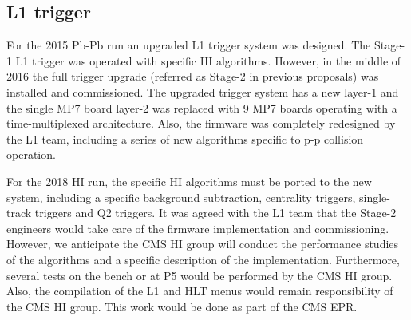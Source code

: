 \subsection{L1 trigger\label{subsec:L1Trigger}} For the 2015 Pb-Pb run an upgraded L1 trigger system was designed. The
Stage-1 L1 trigger was operated with specific HI algorithms. However, in the middle of 2016 the full trigger upgrade
(referred as Stage-2 in previous proposals) was installed and commissioned. The upgraded trigger system has a new
layer-1 and the single MP7 board layer-2 was replaced with 9 MP7 boards operating with a time-multiplexed architecture.
Also, the firmware was completely redesigned by the L1 team, including a series of new algorithms specific to p-p
collision operation.

For the 2018 HI run, the specific HI algorithms must be ported to the new system, including a specific background
subtraction, centrality triggers, single-track triggers and Q2 triggers. It was agreed with the L1 team that the Stage-2
engineers would take care of the firmware implementation and commissioning. However, we anticipate the CMS HI group will
conduct the performance studies of the algorithms and a specific description of the implementation. Furthermore, several
tests on the bench or at P5 would be performed by the CMS HI group. Also, the compilation of the L1 and HLT menus would
remain responsibility of the CMS HI group. This work would be done as part of the CMS EPR.
